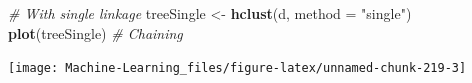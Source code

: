 \documentclass[]{book}
\newenvironment{Shaded}{\begin{snugshade}}{\end{snugshade}}
\newcommand{\KeywordTok}[1]{\textcolor[rgb]{0.13,0.29,0.53}{\textbf{#1}}}
\newcommand{\DataTypeTok}[1]{\textcolor[rgb]{0.13,0.29,0.53}{#1}}
\newcommand{\StringTok}[1]{\textcolor[rgb]{0.31,0.60,0.02}{#1}}
\newcommand{\CommentTok}[1]{\textcolor[rgb]{0.56,0.35,0.01}{\textit{#1}}}
\newcommand{\NormalTok}[1]{#1}
\theoremstyle{definition}
\theoremstyle{definition}
\theoremstyle{definition}
\theoremstyle{remark}
\begin{document}
\begin{Shaded}
\begin{Highlighting}[]

\CommentTok{# With single linkage}
\NormalTok{treeSingle <-}\StringTok{ }\KeywordTok{hclust}\NormalTok{(d, }\DataTypeTok{method =} \StringTok{"single"}\NormalTok{)}
\KeywordTok{plot}\NormalTok{(treeSingle) }\CommentTok{# Chaining}
\end{Highlighting}
\end{Shaded}

\begin{center}\texttt{[image: Machine-Learning\_files/figure-latex/unnamed-chunk-219-3]} \end{center}

\begin{Shaded}
\begin{Highlighting}[]


\end{Highlighting}
\end{Shaded}
\end{document}
